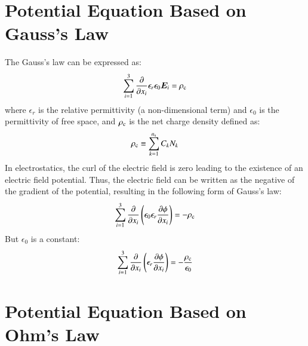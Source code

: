 \documentclass{warpdoc}
\newcommand{\ns}{{n_{\rm s}}}
\renewcommand{\vec}[1]{\bm{#1}}
\begin{document}
\section{Potential Equation Based on Gauss's Law}

The Gauss's law can be expressed as:
%
\begin{equation}
    \sum_{i=1}^3 \frac{\partial }{\partial x_i} \epsilon_r \epsilon_0 \vec{E}_i = \rho_{\rm c} 
\end{equation}
%
where $\epsilon_r$ is the relative permittivity (a non-dimensional term) and $\epsilon_0$ is the permittivity of free space, and $\rho_{\rm c}$ is the net charge density defined as:
%
\begin{equation}
\rho_{\rm c}\equiv
\sum_{k=1}^\ns C_k N_k
\end{equation}
%
In electrostatics, the curl of the electric field is zero leading to the existence of an electric field potential. Thus, the electric field can be written as the negative of the gradient of the potential, resulting in the following form of Gauss's law:
%
\begin{equation}
 \sum_{i=1}^3 \frac{\partial }{\partial x_i}\left(\epsilon_0 \epsilon_r \frac{\partial \phi}{\partial x_i} \right)=   -\rho_{\rm c} 
\end{equation}
%
But $\epsilon_0$ is a constant:
%
\begin{equation}
 \sum_{i=1}^3 \frac{\partial }{\partial x_i}\left( \epsilon_r \frac{\partial \phi}{\partial x_i} \right)=   -\frac{\rho_{\rm c}}{\epsilon_0} 
\end{equation}
%


\section{Potential Equation Based on Ohm's Law}
\end{document}
